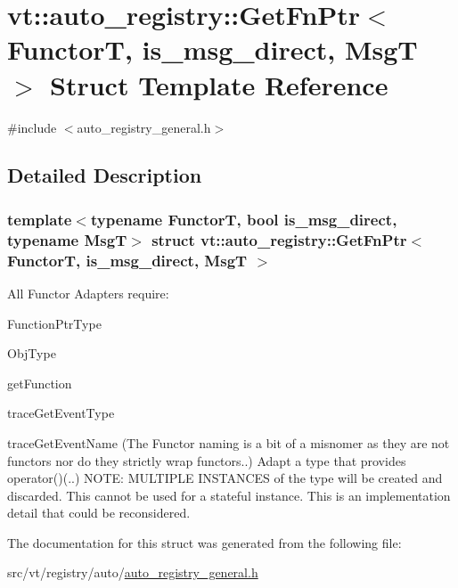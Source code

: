 \hypertarget{structvt_1_1auto__registry_1_1_get_fn_ptr}{}\section{vt\+:\+:auto\+\_\+registry\+:\+:Get\+Fn\+Ptr$<$ FunctorT, is\+\_\+msg\+\_\+direct, MsgT $>$ Struct Template Reference}
\label{structvt_1_1auto__registry_1_1_get_fn_ptr}


{\ttfamily \#include $<$auto\+\_\+registry\+\_\+general.\+h$>$}



\subsection{Detailed Description}
\subsubsection*{template$<$typename FunctorT, bool is\+\_\+msg\+\_\+direct, typename MsgT$>$\newline
struct vt\+::auto\+\_\+registry\+::\+Get\+Fn\+Ptr$<$ Functor\+T, is\+\_\+msg\+\_\+direct, Msg\+T $>$}

All Functor Adapters require\+:
\begin{DoxyItemize}
\item Function\+Ptr\+Type
\item Obj\+Type
\item get\+Function
\item trace\+Get\+Event\+Type
\item trace\+Get\+Event\+Name (The \textquotesingle{}Functor\textquotesingle{} naming is a bit of a misnomer as they are not functors nor do they strictly wrap functors..) Adapt a type that provides operator()(..) N\+O\+TE\+: M\+U\+L\+T\+I\+P\+LE I\+N\+S\+T\+A\+N\+C\+ES of the type will be created and discarded. This cannot be used for a stateful instance. This is an implementation detail that could be reconsidered. 
\end{DoxyItemize}

The documentation for this struct was generated from the following file\+:\begin{DoxyCompactItemize}
\item 
src/vt/registry/auto/\hyperlink{auto__registry__general_8h}{auto\+\_\+registry\+\_\+general.\+h}\end{DoxyCompactItemize}
